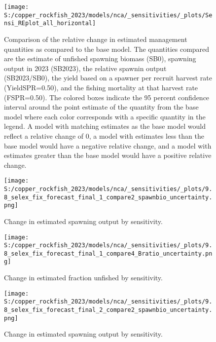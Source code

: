 \documentclass[
  letterpaper,
]{article}
\begin{document}
\begin{figure}
\centering
\texttt{[image: S:/copper\_rockfish\_2023/models/nca/\_sensitivities/\_plots/Sensi\_REplot\_all\_horizontal]}
\caption{Comparison of the relative change in estimated management quantities as compared to the base model. The quantities compared are the estimate of unfished spawning biomass (SB0), spawning output in 2023 (SB2023), the relative spawnin output (SB2023/SB0), the yield based on a spawner per recruit harvest rate (YieldSPR=0.50), and the fishing mortality at that harvest rate (FSPR=0.50). The colored boxes indicate the 95 percent confidence interval around the point estimate of the quantity from the base model where each color corresponds with a specific quantity in the legend. A model with matching estimates as the base model would reflect a relative change of 0, a model with estimates less than the base model would have a negative relative change, and a model with estimates greater than the base model would have a positive relative change.\label{fig:sens-all}}
\end{figure}

\newpage

\begin{figure}
\centering
\texttt{[image: S:/copper\_rockfish\_2023/models/nca/\_sensitivities/\_plots/9.8\_selex\_fix\_forecast\_final\_1\_compare2\_spawnbio\_uncertainty.png]}
\caption{Change in estimated spawning output by sensitivity.\label{fig:sens-ssb-1}}
\end{figure}

\newpage

\begin{figure}
\centering
\texttt{[image: S:/copper\_rockfish\_2023/models/nca/\_sensitivities/\_plots/9.8\_selex\_fix\_forecast\_final\_1\_compare4\_Bratio\_uncertainty.png]}
\caption{Change in estimated fraction unfished by sensitivity.\label{fig:sens-depl-1}}
\end{figure}

\newpage

\begin{figure}
\centering
\texttt{[image: S:/copper\_rockfish\_2023/models/nca/\_sensitivities/\_plots/9.8\_selex\_fix\_forecast\_final\_2\_compare2\_spawnbio\_uncertainty.png]}
\caption{Change in estimated spawning output by sensitivity.\label{fig:sens-ssb-2}}
\end{figure}

\newpage
\end{document}
